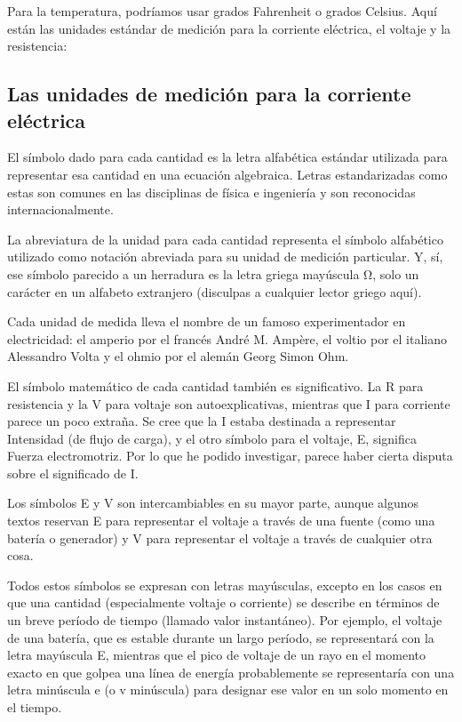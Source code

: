 \documentclass[output=paper, 
colorlinks,
citecolor=brown,
newtxmath
]{langscibook}
\begin{document}
Para la temperatura, podríamos usar grados Fahrenheit o grados Celsius. Aquí están las unidades estándar de medición para la corriente eléctrica, el voltaje y la resistencia:

\subsection{Las unidades de medición para la corriente eléctrica}

El símbolo dado para cada cantidad es la letra alfabética estándar utilizada para representar esa cantidad en una ecuación algebraica. Letras estandarizadas como estas son comunes en las disciplinas de física e ingeniería y son reconocidas internacionalmente.

La abreviatura de la unidad para cada cantidad representa el símbolo alfabético utilizado como notación abreviada para su unidad de medición particular. Y, sí, ese símbolo parecido a un herradura es la letra griega mayúscula Ω, solo un carácter en un alfabeto extranjero (disculpas a cualquier lector griego aquí).

Cada unidad de medida lleva el nombre de un famoso experimentador en electricidad: el amperio por el francés André M. Ampère, el voltio por el italiano Alessandro Volta y el ohmio por el alemán Georg Simon Ohm.

El símbolo matemático de cada cantidad también es significativo. La R para resistencia y la V para voltaje son autoexplicativas, mientras que I para corriente parece un poco extraña. Se cree que la I estaba destinada a representar Intensidad (de flujo de carga), y el otro símbolo para el voltaje, E, significa Fuerza electromotriz. Por lo que he podido investigar, parece haber cierta disputa sobre el significado de I.

Los símbolos E y V son intercambiables en su mayor parte, aunque algunos textos reservan E para representar el voltaje a través de una fuente (como una batería o generador) y V para representar el voltaje a través de cualquier otra cosa.

Todos estos símbolos se expresan con letras mayúsculas, excepto en los casos en que una cantidad (especialmente voltaje o corriente) se describe en términos de un breve período de tiempo (llamado valor instantáneo). Por ejemplo, el voltaje de una batería, que es estable durante un largo período, se representará con la letra mayúscula E, mientras que el pico de voltaje de un rayo en el momento exacto en que golpea una línea de energía probablemente se representaría con una letra minúscula e (o v minúscula) para designar ese valor en un solo momento en el tiempo.
\end{document}
